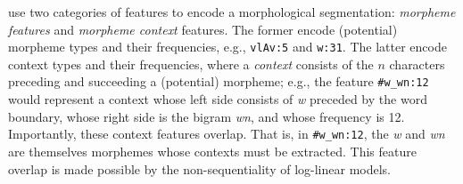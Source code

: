 {%
\cite{poon-et-al:2009} use two categories of features to encode a morphological segmentation: \textit{morpheme features} and \textit{morpheme context} features.
The former encode (potential) morpheme types and their frequencies, e.g., \texttt{vlAv:5} and \texttt{w:31}. The 
latter encode context types and their frequencies, where a \emph{context} consists of the $n$ characters preceding and succeeding a (potential) morpheme;
e.g., the feature \texttt{\#w\_wn:12} would represent a context whose left side consists of \textit{w} preceded by the word boundary, whose right side is the bigram \textit{wn}, and whose frequency is 12. Importantly, these context features overlap. That is, in \texttt{\#w\_wn:12}, the \textit{w} and \textit{wn} are themselves morphemes whose contexts must be extracted.
This feature overlap is made possible by the non-sequentiality of log-linear models.

}
